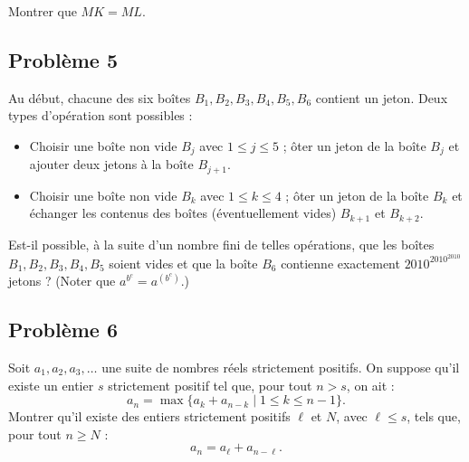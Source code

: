 Montrer que $MK = ML$.

\subsection*{Problème 5}
Au début, chacune des six boîtes $B_1, B_2, B_3, B_4, B_5, B_6$ contient un jeton. Deux types d'opération
sont possibles :
\begin{itemize}
  \item[\emph{Type} 1 :] Choisir une boîte non vide $B_j$ avec $1 \leqslant j \leqslant 5$ ; ôter un jeton de la
  boîte $B_j$ et ajouter deux jetons à la boîte $B_{j+1}$.
  \item[\emph{Type} 2 :] Choisir une boîte non vide $B_k$ avec $1 \leqslant k \leqslant 4$ ; ôter un jeton de la
  boîte $B_k$ et échanger les contenus des boîtes (éventuellement vides) $B_{k+1}$ et $B_{k+2}$.
\end{itemize}
Est-il possible, à la suite d'un nombre fini de telles opérations, que les boîtes $B_1, B_2, B_3, B_4, B_5$
soient vides et que la boîte $B_6$ contienne exactement $2010^{2010^{2010}}$ jetons ? (Noter que
$a^{b^c} = a^{(b^c)}$.)

\subsection*{Problème 6}
Soit $a_1, a_2, a_3, \ldots$ une suite de nombres réels strictement positifs. On suppose qu'il existe un
entier $s$ strictement positif tel que, pour tout $n > s$, on ait :
\[
a_n = \max\{a_k + a_{n-k} \mid 1 \leqslant k \leqslant n - 1\}.
\]
Montrer qu'il existe des entiers strictement positifs $\ell$ et $N$, avec $\ell \leqslant s$, tels que, pour
tout $n \geqslant N$ :
\[
a_n = a_\ell + a_{n-\ell}.
\]
